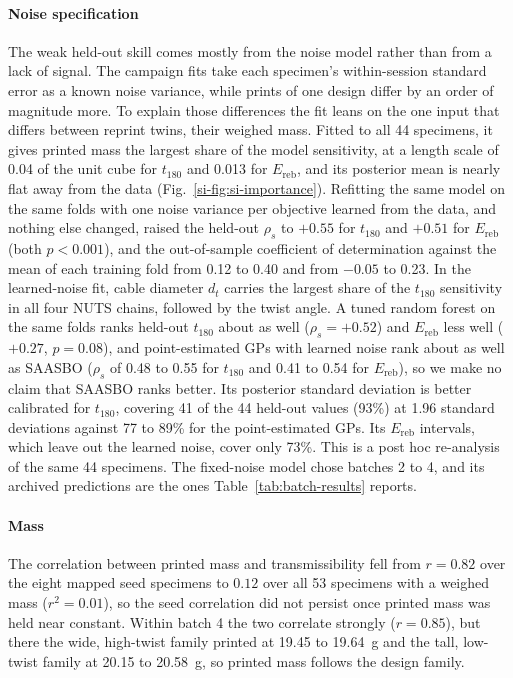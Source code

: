 \documentclass[lineno,nocopyright,upint,varvw,hyphenate]{asmejour}
\newcommand{\siref}[1]{\ref*{si-#1}}
\begin{document}
\paragraph{Noise specification} The weak held-out skill comes mostly
from the noise model rather than from a lack of signal. The campaign
fits take each specimen's within-session standard error as a known noise
variance, while prints of one design differ by an order of magnitude
more. To explain those differences the fit leans on the one input that
differs between reprint twins, their weighed mass. Fitted to all 44
specimens, it gives printed mass the largest share of the model
sensitivity, at a length scale of 0.04 of the unit cube for $t_{180}$
and 0.013 for $E_{\mathrm{reb}}$, and its posterior mean is nearly flat
away from the data (Fig.~\siref{fig:si-importance}). Refitting the same
model on the same folds with one noise variance per objective learned
from the data, and nothing else changed, raised the held-out $\rho_s$
to $+0.55$ for $t_{180}$ and $+0.51$ for $E_{\mathrm{reb}}$ (both
$p < 0.001$), and the out-of-sample coefficient of determination against
the mean of each training fold from 0.12 to 0.40 and from $-0.05$ to
0.23. In the learned-noise fit, cable diameter $d_t$ carries the largest
share of the $t_{180}$ sensitivity in all four NUTS chains, followed by
the twist angle. A tuned random forest on the same folds ranks held-out
$t_{180}$ about as well ($\rho_s = +0.52$) and $E_{\mathrm{reb}}$ less
well ($+0.27$, $p = 0.08$), and point-estimated GPs with learned noise
rank about as well as SAASBO ($\rho_s$ of 0.48 to 0.55 for $t_{180}$ and
0.41 to 0.54 for $E_{\mathrm{reb}}$), so we make no claim that SAASBO
ranks better. Its posterior standard deviation is better calibrated for
$t_{180}$, covering 41 of the 44 held-out values (93\%) at 1.96
standard deviations against 77 to 89\% for the point-estimated GPs. Its
$E_{\mathrm{reb}}$ intervals, which leave out the learned noise, cover
only 73\%. This is a
post hoc re-analysis of the same 44 specimens. The fixed-noise model
chose batches 2 to 4, and its archived predictions are the ones
Table~\ref{tab:batch-results} reports.

\paragraph{Mass} The correlation between printed mass and
transmissibility fell from $r = 0.82$ over the eight mapped seed
specimens to $0.12$ over all 53 specimens with a weighed mass ($r^2 = 0.01$), so the
seed correlation did not persist once printed mass was held near
constant. Within batch 4 the two correlate strongly
($r = 0.85$), but there the wide, high-twist family printed at 19.45 to
\SI{19.64}{g} and the tall, low-twist family at 20.15 to
\SI{20.58}{g}, so printed mass follows the design family.
\end{document}
